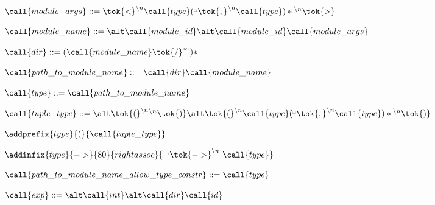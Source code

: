  
   \item $\call{module\_args} ::=
   \tok{<}^{\backslash{}n} \call{type} ({}^{\textrm{\textvisiblespace}}\tok{,}^{\backslash{}n} \call{type})* {}^{\backslash{}n}\tok{>}$
   
 
   \item $\call{module\_name} ::= \\
   \alt \call{module\_id} \\
   \alt \call{module\_id}\call{module\_args}$
    
 
   \item $\call{dir} ::= (\call{module\_name} \tok{/}^\nleftrightarrow)*$
   \item $\call{path\_to\_module\_name} ::=  \call{dir}\call{module\_name}$
   

  \item $\call{type} ::= \call{path\_to\_module\_name}$
   
 
   \item $\call{tuple\_type} ::= \\
    \alt \tok{(}^{\backslash{}n}{}^{\backslash{}n}\tok{)}\\
    \alt \tok{(}^{\backslash{}n} \call{type} ({}^{\textrm{\textvisiblespace}}\tok{,}^{\backslash{}n} \call{type})* {}^{\backslash{}n}\tok{)}$
   \item $\addprefix{type}{(}{\call{tuple\_type}}$
    

  \item $\addinfix{type}{->}{80}{rightassoc}{
  \ {}^{\textrm{\textvisiblespace}}\tok{->}^{\backslash{}n}\ \call{type}}$


  \item $\call{path\_to\_module\_name\_allow\_type\_constr} ::= \call{type}$
  

  \item $\call{exp} ::=\\
  \alt \call{int}\\
  \alt \call{dir}\call{id}$
   

